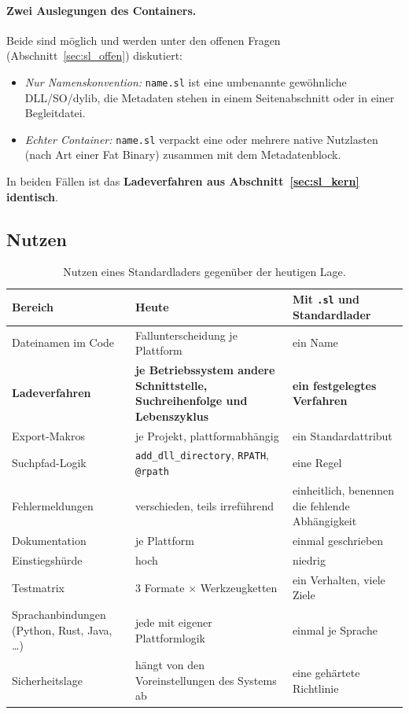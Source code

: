 \paragraph{Zwei Auslegungen des Containers.} Beide sind möglich und werden unter den offenen Fragen (Abschnitt~\ref{sec:sl_offen}) diskutiert:

\begin{itemize}
	\item \emph{Nur Namenskonvention:} \texttt{name.sl} ist eine umbenannte gewöhnliche DLL/SO/dylib, die Metadaten stehen in einem Seitenabschnitt oder in einer Begleitdatei.
	\item \emph{Echter Container:} \texttt{name.sl} verpackt eine oder mehrere native Nutzlasten (nach Art einer Fat Binary) zusammen mit dem Metadatenblock.
\end{itemize}

In beiden Fällen ist das \textbf{Ladeverfahren aus Abschnitt~\ref{sec:sl_kern} identisch}.

\subsection{Nutzen}

\begin{table}[!ht]
	\centering
	\small
	\begin{tabularx}{\textwidth}{@{}L{3.4cm}YY@{}}
		\toprule
		Bereich & Heute & Mit \texttt{.sl} und Standardlader \\
		\midrule
		Dateinamen im Code & Fallunterscheidung je Plattform & ein Name \\[0.3em]
		\textbf{Ladeverfahren} & \textbf{je Betriebssystem andere Schnittstelle, Suchreihenfolge und Lebenszyklus} & \textbf{ein festgelegtes Verfahren} \\[0.3em]
		Export-Makros & je Projekt, plattformabhängig & ein Standardattribut \\[0.3em]
		Suchpfad-Logik & \texttt{add\_dll\_directory}, \texttt{RPATH}, \texttt{@rpath} & eine Regel \\[0.3em]
		Fehlermeldungen & verschieden, teils irreführend & einheitlich, benennen die fehlende Abhängigkeit \\[0.3em]
		Dokumentation & je Plattform & einmal geschrieben \\[0.3em]
		Einstiegshürde & hoch & niedrig \\[0.3em]
		Testmatrix & 3 Formate $\times$ Werkzeugketten & ein Verhalten, viele Ziele \\[0.3em]
		Sprachanbindungen (Python, Rust, Java, \ldots) & jede mit eigener Plattformlogik & einmal je Sprache \\[0.3em]
		Sicherheitslage & hängt von den Voreinstellungen des Systems ab & eine gehärtete Richtlinie \\
		\bottomrule
	\end{tabularx}
	\caption{Nutzen eines Standardladers gegenüber der heutigen Lage.}
	\label{tab:sl_nutzen}
\end{table}


